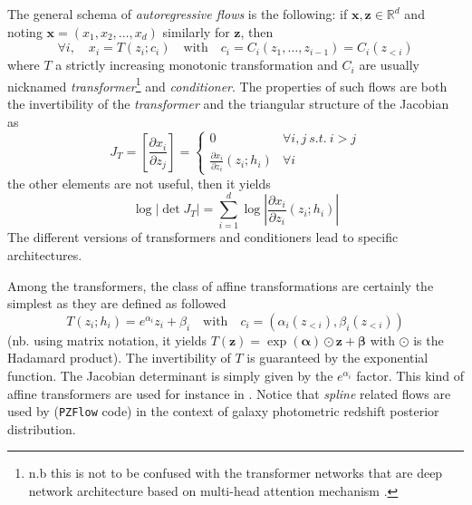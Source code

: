 \documentclass[11pt]{amsart}
\begin{document}
The general schema of \textit{autoregressive flows} is the following: if $\bm{x},\bm{z}\in \mathbb{R}^d$ and noting $\bm{x}=(x_1,x_2,\dots,x_d)$ similarly for $\bm{z}$, then
\begin{equation}
\forall i, \quad x_i = T(z_i;c_i) \quad \mathrm{with} \quad c_i = C_i(z_1,\dots,z_{i-1})=C_i(z_{<i})
\end{equation}
where $T$ a strictly increasing monotonic transformation  and $C_i$ are usually nicknamed \textit{transformer}\footnote{n.b this is not to be confused with the transformer networks that are deep network architecture based on multi-head attention mechanism \citep{Vaswani2017}.} and \textit{conditioner}. The properties of such flows are both the invertibility of the \textit{transformer} and the triangular structure of the Jacobian as
\begin{equation}
J_T = \left[ \frac{\partial x_i}{\partial z_j} \right] =  \begin{cases}
0 & \forall i,j\ s.t.\ i>j \\
\frac{\partial x_i}{\partial z_i}(z_i;h_i) &  \forall i
\end{cases}
\end{equation}
the other elements are not useful, then it yields
\begin{equation}
\log |\det J_T| = \sum_{i=1}^d \log \left| \frac{\partial x_i}{\partial z_i}(z_i;h_i) \right|
\end{equation}
The different versions of transformers and conditioners lead to specific architectures.

Among the transformers, the class of affine transformations are certainly the simplest as they are defined as followed
\begin{equation}
T(z_i;h_i) = e^{\alpha_i} z_i + \beta_i \quad \mathrm{with} \quad c_i = (\alpha_i(z_{<i}),\beta_i(z_{<i}))
\label{eq-affine-coupling}
\end{equation}
(nb. using matrix notation, it yields $T(\bm{z}) = \exp(\bm{\alpha}) \odot \bm{z} + \bm{\beta}$ with  $\odot$ is the Hadamard product).
The invertibility of $T$ is guaranteed by the exponential function. The Jacobian determinant is simply given by the $e^{\alpha_i}$ factor. This kind of affine transformers are used for instance in \citep{DinhKB14,Papamakarios2017a,DinhSB17,Kingma2018}. Notice that \textit{spline} related flows are used by \cite{Crenshaw_2024} (\texttt{PZFlow} code) in the context of galaxy photometric redshift posterior distribution.  
\end{document}
